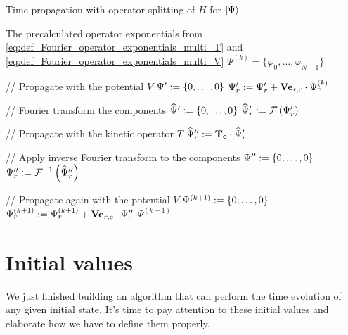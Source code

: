 \begin{algorithm}
\caption{Time propagation with operator splitting of $H$ for $\Ket{\Psi}$}
\label{al:Fourier_propagation_multi}
\begin{algorithmic}
  \REQUIRE The precalculated operator exponentials from \eqref{eq:def_Fourier_operator_exponentials_multi_T} and \eqref{eq:def_Fourier_operator_exponentials_multi_V}
  \STATE $\Psi^{\left(k\right)} = \{ \varphi_0, \ldots, \varphi_{N-1} \}$

  \STATE // Propagate with the potential $V$
  \STATE $\Psi^{\prime} := \{0, \ldots, 0\}$
      \STATE $\Psi^{\prime}_r := \Psi^{\prime}_r + \mathbf{Ve}_{r,c} \cdot \Psi^{\left(k\right)}_c$
    \ENDFOR
  \ENDFOR

  \STATE // Fourier transform the components
  \STATE $\widehat{\Psi}^{\prime}  := \{0, \ldots, 0\}$
    \STATE $\widehat{\Psi}^{\prime}_r := \mathcal{F}\left(\Psi^{\prime}_r\right)$
  \ENDFOR

  \STATE // Propagate with the kinetic operator $T$
    \STATE $\widehat{\Psi}^{\prime\prime}_r := \mathbf{T_e} \cdot \widehat{\Psi}^{\prime}_r$
  \ENDFOR

  \STATE // Apply inverse Fourier transform to the components
  \STATE $\Psi^{\prime\prime}  := \{0, \ldots, 0\}$
    \STATE $\Psi^{\prime\prime}_r := \mathcal{F}^{-1}\left(\widehat{\Psi}^{\prime\prime}_r\right)$
  \ENDFOR

  \STATE // Propagate again with the potential $V$
  \STATE $\Psi^{\left(k+1\right)} := \{0, \ldots, 0\}$
      \STATE $\Psi^{\left(k+1\right)}_r := \Psi^{\left(k+1\right)}_r + \mathbf{Ve}_{r,c} \cdot \Psi^{\prime\prime}_c$
    \ENDFOR
  \ENDFOR
  \RETURN $\Psi^{\left(k+1\right)}$
\end{algorithmic}
\end{algorithm}


\section{Initial values}

We just finished building an algorithm that can perform the time evolution of any
given initial state. It's time to pay attention to these initial values and elaborate
how we have to define them properly.

